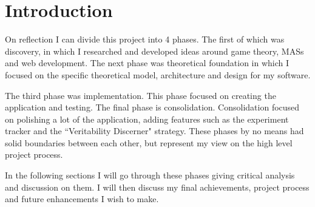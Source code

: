 \documentclass[]{final_report}
\begin{document}
\section{Introduction}
On reflection I can divide this project into 4 phases. The first of which was discovery, in which I researched and developed ideas around game theory, MASs and web development. The next phase was theoretical foundation in which I focused on the specific theoretical model, architecture and design for my software.\par 
The third phase was implementation. This phase focused on creating the application and testing. The final phase is consolidation. Consolidation focused on polishing a lot of the application, adding features such as the experiment tracker and the ``Veritability Discerner" strategy. These phases by no means had solid boundaries between each other, but represent my view on the high level project process.\par 
In the following sections I will go through these phases giving critical analysis and discussion on them. I will then discuss my final achievements, project process and future enhancements I wish to make.
\end{document}
